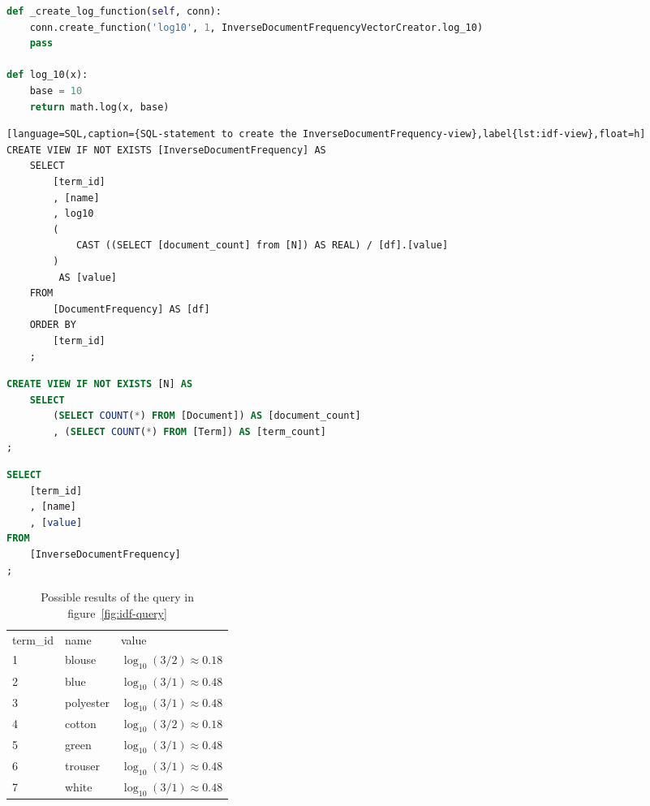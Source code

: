 \begin{lstlisting}[language=Python,caption={Preparing the log-function for SQL-statement in listing~\ref{lst:idf-view}},label={lst:idf-log-function},float=h]
def _create_log_function(self, conn):
    conn.create_function('log10', 1, InverseDocumentFrequencyVectorCreator.log_10)
    pass

def log_10(x):
    base = 10
    return math.log(x, base)
\end{lstlisting}
\begin{lstlisting}[language=SQL,caption={SQL-statement to create the InverseDocumentFrequency-view},label{lst:idf-view},float=h]
CREATE VIEW IF NOT EXISTS [InverseDocumentFrequency] AS
    SELECT
        [term_id]
        , [name]
        , log10
        (
            CAST ((SELECT [document_count] from [N]) AS REAL) / [df].[value]
        )
         AS [value]
    FROM
        [DocumentFrequency] AS [df]
    ORDER BY
        [term_id]
    ;
\end{lstlisting}


\begin{lstlisting}[language=SQL,caption={SQL-statement to create the N-view},label={lst:n-view},float=h]
CREATE VIEW IF NOT EXISTS [N] AS
    SELECT
        (SELECT COUNT(*) FROM [Document]) AS [document_count]
        , (SELECT COUNT(*) FROM [Term]) AS [term_count]
;
\end{lstlisting}


\begin{lstlisting}[language=SQL,caption={SQL-query for generating idf-vectors},label={fig:idf-query},float=h]
SELECT
    [term_id]
    , [name]
    , [value]
FROM
    [InverseDocumentFrequency]
;
\end{lstlisting}


\begin{table}
    \center
    \begin{tabular}{ l | l | l }
        \rowcolor{\dustRowHead}
        \multicolumn{3}{ c }{\textbf{idf}}\\\hline
        term\_id    & name      & value\\\hline
        1           & blouse    & $\log_{10}(3/2) \approx 0.18$\\
        2           & blue      & $\log_{10}(3/1) \approx 0.48$\\
        3           & polyester & $\log_{10}(3/1) \approx 0.48$\\
        4           & cotton    & $\log_{10}(3/2) \approx 0.18$\\
        5           & green     & $\log_{10}(3/1) \approx 0.48$\\
        6           & trouser   & $\log_{10}(3/1) \approx 0.48$\\
        7           & white     & $\log_{10}(3/1) \approx 0.48$\\
    \end{tabular}
    \caption{Possible results of the query in figure~\ref{fig:idf-query}}
    \label{tab:idf-query-result}
\end{table}

